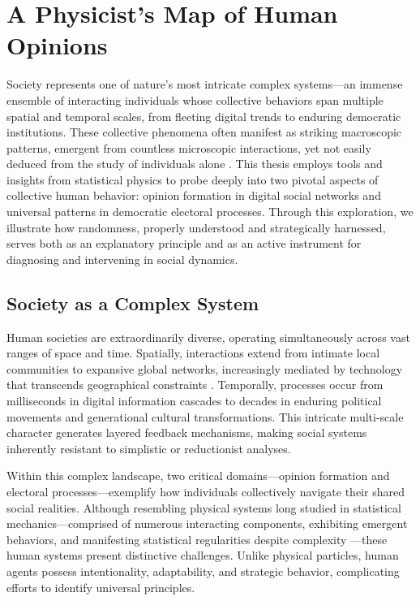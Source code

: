 \chapter{A Physicist's Map of Human Opinions}
\label{chap1}

Society represents one of nature's most intricate complex systems—an immense ensemble of interacting individuals whose collective behaviors span multiple spatial and temporal scales, from fleeting digital trends to enduring democratic institutions. These collective phenomena often manifest as striking macroscopic patterns, emergent from countless microscopic interactions, yet not easily deduced from the study of individuals alone \cite{galam2012sociophysics}. This thesis employs tools and insights from statistical physics to probe deeply into two pivotal aspects of collective human behavior: opinion formation in digital social networks and universal patterns in democratic electoral processes. Through this exploration, we illustrate how randomness, properly understood and strategically harnessed, serves both as an explanatory principle and as an active instrument for diagnosing and intervening in social dynamics.

\section{Society as a Complex System}

Human societies are extraordinarily diverse, operating simultaneously across vast ranges of space and time. Spatially, interactions extend from intimate local communities to expansive global networks, increasingly mediated by technology that transcends geographical constraints \cite{social-media-as-public-opinion}. Temporally, processes occur from milliseconds in digital information cascades to decades in enduring political movements and generational cultural transformations. This intricate multi-scale character generates layered feedback mechanisms, making social systems inherently resistant to simplistic or reductionist analyses.

Within this complex landscape, two critical domains—opinion formation and electoral processes—exemplify how individuals collectively navigate their shared social realities. Although resembling physical systems long studied in statistical mechanics—comprised of numerous interacting components, exhibiting emergent behaviors, and manifesting statistical regularities despite complexity \cite{galam1982sociophysics, galam1991towards}—these human systems present distinctive challenges. Unlike physical particles, human agents possess intentionality, adaptability, and strategic behavior, complicating efforts to identify universal principles.

